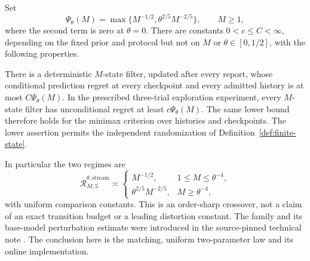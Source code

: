 \begin{theorem}\label{thm:uniform-streaming}
Set
\begin{equation}\label{eq:five-resolution}
 \Psi_\theta(M)=\max\{M^{-1/2},\theta^{2/5}M^{-2/5}\},
 \qquad M\ge1,
\end{equation}
where the second term is zero at $\theta=0$. There are constants
$0<c\le C<\infty$, depending on the fixed prior and protocol but not on
$M$ or $\theta\in[0,1/2]$, with the following properties.

There is a deterministic $M$-state filter, updated after every report,
whose conditional prediction regret at every checkpoint and every
admitted history is at most $C\Psi_\theta(M)$. In the prescribed
three-trial exploration experiment, every $M$-state filter has
unconditional regret at least $c\Psi_\theta(M)$. The same lower bound
therefore holds for the minimax criterion over histories and checkpoints.
The lower assertion permits the independent randomization of
Definition~\ref{def:finite-state}.
\end{theorem}

In particular the two regimes are
\begin{equation}\label{eq:two-regimes}
 \overline{\mathcal R}^{\theta,\mathrm{stream}}_{M,5}\asymp
 \begin{cases}
 M^{-1/2},&1\le M\le\theta^{-4},\\
 \theta^{2/5}M^{-2/5},&M\ge\theta^{-4},
 \end{cases}
\end{equation}
with uniform comparison constants. This is an order-sharp crossover, not
a claim of an exact transition budget or a leading distortion constant.
The family and its base-model perturbation estimate were introduced in
the source-pinned technical note \cite{A1v6note}. The conclusion here is
the matching, uniform two-parameter law and its online implementation.

